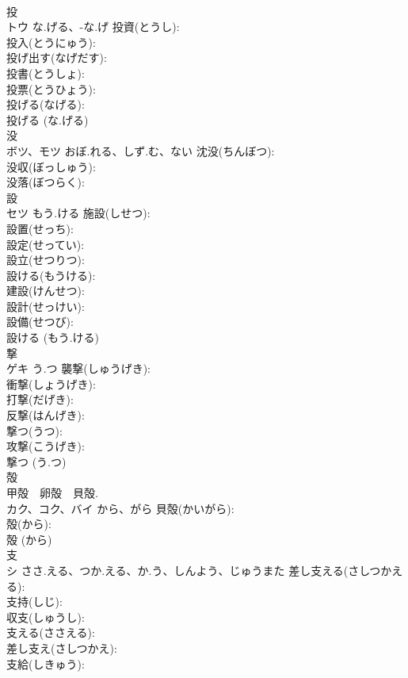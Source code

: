 \documentclass[8pt]{extreport}
\begin{document}
\begin{CJK}{UTF8}{min}
\\	投			
\\	トウ	な.げる、-な.げ	投資(とうし): 
\\	投入(とうにゅう): 
\\	投げ出す(なげだす): 
\\	投書(とうしょ): 
\\	投票(とうひょう): 
\\	投げる(なげる): 
\\	投げる (な.げる)
\\	没			
\\	ボツ、モツ	おぼ.れる、しず.む、ない	沈没(ちんぼつ): 
\\	没収(ぼっしゅう): 
\\	没落(ぼつらく): 
\\	設			
\\	セツ	もう.ける	施設(しせつ): 
\\	設置(せっち): 
\\	設定(せってい): 
\\	設立(せつりつ): 
\\	設ける(もうける): 
\\	建設(けんせつ): 
\\	設計(せっけい): 
\\	設備(せつび): 
\\	設ける (もう.ける)
\\	撃			
\\	ゲキ	う.つ	襲撃(しゅうげき): 
\\	衝撃(しょうげき): 
\\	打撃(だげき): 
\\	反撃(はんげき): 
\\	撃つ(うつ): 
\\	攻撃(こうげき): 
\\	撃つ (う.つ)
\\	殻			
\\	甲殻　卵殻　貝殻.	
\\	カク、コク、バイ	から、がら	貝殻(かいがら): 
\\	殻(から): 
\\	殻 (から)
\\	支			
\\	シ	ささ.える、つか.える、か.う、しんよう、じゅうまた	差し支える(さしつかえる): 
\\	支持(しじ): 
\\	収支(しゅうし): 
\\	支える(ささえる): 
\\	差し支え(さしつかえ): 
\\	支給(しきゅう): 

\end{CJK}
\end{document}
